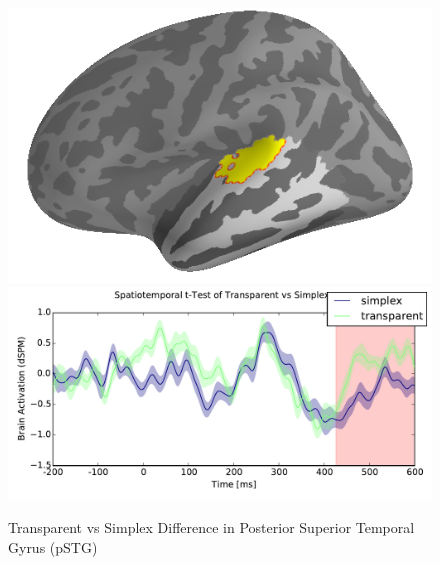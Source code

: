 \documentclass{frontiersSCNS}
\begin{document}
\begin{figure}
\begin{centering}
\includegraphics[scale=0.50]{images/transparent_2_prime_brain_analysis}\includegraphics[scale=0.50]{images/transparent_2_prime_analysis}
\par\end{centering}
\caption{\label{fig:transparent_2_primes} Transparent vs Simplex Difference in Posterior Superior Temporal Gyrus (pSTG)}
\end{figure}
\end{document}
